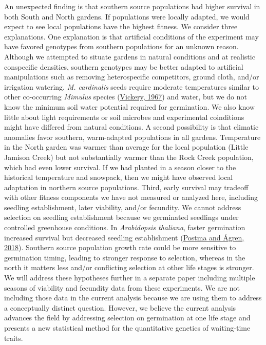\documentclass[
  12pt,
]{article}
\begin{document}
An unexpected finding is that southern source populations had higher survival in both South and North gardens. If populations were locally adapted, we would expect to see local populations have the highest fitness. We consider three explanations. One explanation is that artificial conditions of the experiment may have favored genotypes from southern populations for an unknown reason. Although we attempted to situate gardens in natural conditions and at realistic conspecific densities, southern genotypes may be better adapted to artificial manipulations such as removing heterospecific competitors, ground cloth, and/or irrigation watering. \emph{M. cardinalis} seeds require moderate temperatures similar to other co-occurring \emph{Mimulus} species (\protect\hyperlink{ref-vickery_ranges_1967}{Vickery, 1967}) and water, but we do not know the minimum soil water potential required for germination. We also know little about light requirements or soil microbes and experimental coinditions might have differed from natural conditions. A second possibility is that climatic anomalies favor southern, warm-adapted populations in all gardens. Temperature in the North garden was warmer than average for the local population (Little Jamison Creek) but not substantially warmer than the Rock Creek population, which had even lower survival. If we had planted in a season closer to the historical temperature and snowpack, then we might have observed local adaptation in northern source populations. Third, early survival may tradeoff with other fitness components we have not measured or analyzed here, including seedling establishment, later viability, and/or fecundity. We cannot address selection on seedling establishment because we germinated seedlings under controlled greenhouse conditions. In \emph{Arabidopsis thaliana}, faster germination increased survival but decreased seedling establishment (\protect\hyperlink{ref-postma_among-year_2018}{Postma and Ågren, 2018}). Southern source population growth rate could be more sensitive to germination timing, leading to stronger response to selection, whereas in the north it matters less and/or conflicting selection at other life stages is stronger. We will address these hypotheses further in a separate paper including multiple seasons of viability and fecundity data from these experiments. We are not including those data in the current analysis because we are using them to address a conceptually distinct question. However, we believe the current analysis advances the field by addressing selection on germination at one life stage and presents a new statistical method for the quantitative genetics of waiting-time traits.
\end{document}
